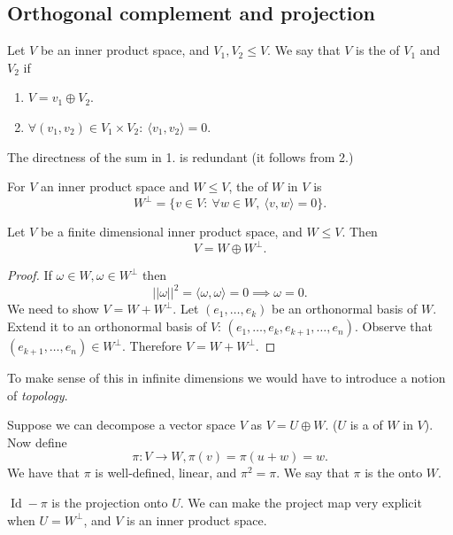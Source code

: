\documentclass[a4paper]{scrartcl}
\begin{document}
\subsection{Orthogonal complement and projection}
\begin{definition}
      Let $V$ be an inner product space, and $V_1, V_2 \leq V$. We say that $V$ is the  of $V_1$ and $V_2$ if 
      \begin{enumerate}
           \item $V=v_1 \oplus V_2$.
           \item $\forall (v_1,v_2) \in V_1 \times V_2: \ \langle v_1 ,v_2 \rangle =0 $.
      \end{enumerate}
\end{definition}
\begin{remark}
      The directness of the sum in 1. is redundant (it follows from 2.)
\end{remark}
\begin{definition}
      For $V$ an inner product space and $W \leq V$, the  of $W$ in $V$ is 
      \[W^{\perp}=\{v \in V: \ \forall w \in W, \ \langle v,w \rangle =0 \}.\]
\end{definition}

\begin{lemma}
      Let $V$ be a finite dimensional inner product space, and $W \leq V$. Then 
      \[V=W \oplus W^{\perp}.\]
\end{lemma}
\begin{proof}
     If $\omega \in W, \omega \in W^\perp$ then 
     \[||\omega||^2=\langle \omega,\omega \rangle  =0 \implies \omega=0.\]
     We need to show $V=W+W^\perp$. Let $\left(e_1, \ldots ,e_k\right)$ be an orthonormal basis of $W$. Extend it to an orthonormal basis of $V$: $(e_1,\ldots ,e_k, e_{k+1},\ldots ,e_n)$. Observe that $(e_{k+1},\ldots ,e_n)\in W^\perp$. Therefore $V=W+W^\perp$.
\end{proof}
\begin{remark}
      To make sense of this in infinite dimensions we would have to introduce a notion of \emph{topology}.
\end{remark}
\begin{definition}
     Suppose we can decompose a vector space $V$ as $V=U \oplus W$. ($U$ is a  of $W$ in $V$). Now define 
     \[\pi: V \rightarrow W, \pi(v)=\pi(u+w)=w.\]
     We have that $\pi$ is well-defined, linear, and $\pi^2=\pi$. We say that $\pi$ is the  onto $W$.
\end{definition}
\begin{remark}
     $\operatorname{Id}-\pi$ is the projection onto $U$. We can make the project map very explicit when $U=W^\perp$, and $V$ is an inner product space.
\end{remark}
\end{document}
